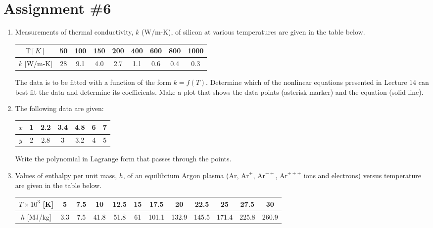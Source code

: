 \chapter{Assignment \#6}
\label{ch:ass6n}

\begin{fullwidth}
\begin{enumerate}
\item Measurements of thermal conductivity, $k$ (W/m-K), of silicon at various temperatures are given in the table below.

\begin{table}[h!]
\centering
\begin{tabular}{|c|c|c|c|c|c|c|c|c|}
\hline
$\text{T} [K]$ & 50 & 100 & 150 & 200 & 400 & 600 & 800 & 1000 \\ \hline
$k$ [W/m-K] & 28 & 9.1 & 4.0 & 2.7 & 1.1 & 0.6 & 0.4 & 0.3 \\ \hline
\end{tabular}
\end{table}

The data is to be fitted with a function of the form $k=f(T)$.  Determine which of the nonlinear equations presented in Lecture 14 can best fit the data and determine its coefficients.  Make a plot that shows the data points (asterisk marker) and the equation (solid line).

\vspace{3.0cm}

\item The following data are given:

\begin{table}[h!]
\centering
\begin{tabular}{|c|c|c|c|c|c|c|}
\hline
$x$ & 1 & 2.2 & 3.4 & 4.8 & 6 & 7 \\ \hline
$y$ & 2 & 2.8 & 3 & 3.2 & 4 & 5 \\ \hline
\end{tabular}
\end{table}

Write the polynomial in Lagrange form that passes through the points.

\pagebreak

\item Values of enthalpy per unit mass, $h$, of an equilibrium Argon plasma (Ar, $\text{Ar}^{+}$, $\text{Ar}^{++}$, $\text{Ar}^{+++}$ ions and electrons) versus temperature are given in the table below.

\begin{table}[h!]
\centering
\begin{tabular}{|c|c|c|c|c|c|c|c|c|c|c|c|}
\hline
$T \times 10^3$ [K] & 5 & 7.5 & 10 & 12.5 & 15 & 17.5 & 20 & 22.5 & 25 & 27.5 & 30 \\ \hline
$h$ [MJ/kg] & 3.3 & 7.5 & 41.8 & 51.8 & 61 & 101.1 & 132.9 & 145.5 & 171.4 & 225.8 & 260.9 \\ \hline
\end{tabular}
\end{table}


\end{enumerate}
\end{fullwidth}
